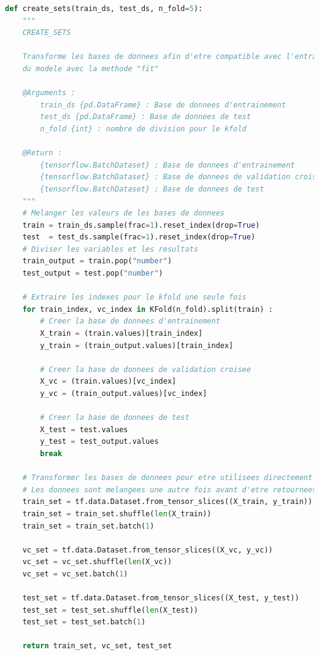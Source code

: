 \documentclass{article}
\begin{document}
\begin{lstlisting}[language=Python, caption={Création des bases de données pour l'entraînement}, label={code:create_ds}]
def create_sets(train_ds, test_ds, n_fold=5):
    """
    CREATE_SETS

    Transforme les bases de donnees afin d'etre compatible avec l'entrainement
    du modele avec la methode "fit"

    @Arguments :
        train_ds {pd.DataFrame} : Base de donnees d'entrainement
        test_ds {pd.DataFrame} : Base de donnees de test
        n_fold {int} : nombre de division pour le kfold

    @Return :
        {tensorflow.BatchDataset} : Base de donnees d'entrainement
        {tensorflow.BatchDataset} : Base de donnees de validation croisee
        {tensorflow.BatchDataset} : Base de donnees de test
    """
    # Melanger les valeurs de les bases de donnees
    train = train_ds.sample(frac=1).reset_index(drop=True)
    test  = test_ds.sample(frac=1).reset_index(drop=True)
    # Diviser les variables et les resultats
    train_output = train.pop("number")
    test_output = test.pop("number")

    # Extraire les indexes pour le kfold une seule fois
    for train_index, vc_index in KFold(n_fold).split(train) :
        # Creer la base de donnees d'entrainement
        X_train = (train.values)[train_index]
        y_train = (train_output.values)[train_index]

        # Creer la base de donnees de validation croisee
        X_vc = (train.values)[vc_index]
        y_vc = (train_output.values)[vc_index]

        # Creer la base de donnees de test
        X_test = test.values
        y_test = test_output.values
        break

    # Transformer les bases de donnees pour etre utilisees directement dans fit
    # Les donnees sont melangees une autre fois avant d'etre retournees
    train_set = tf.data.Dataset.from_tensor_slices((X_train, y_train))
    train_set = train_set.shuffle(len(X_train))
    train_set = train_set.batch(1)

    vc_set = tf.data.Dataset.from_tensor_slices((X_vc, y_vc))
    vc_set = vc_set.shuffle(len(X_vc))
    vc_set = vc_set.batch(1)

    test_set = tf.data.Dataset.from_tensor_slices((X_test, y_test))
    test_set = test_set.shuffle(len(X_test))
    test_set = test_set.batch(1)

    return train_set, vc_set, test_set
\end{lstlisting}
\end{document}
